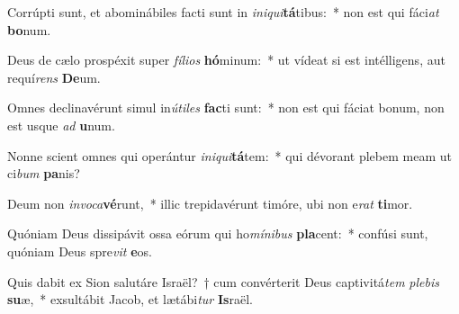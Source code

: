 \item Corrúpti sunt, et abominábiles facti sunt in \textit{in}\textit{i}\textit{qui}\textbf{tá}tibus:~* non est qui fáci\textit{at} \textbf{bo}num.
\item Deus de cælo prospéxit super \textit{fí}\textit{li}\textit{os} \textbf{hó}minum:~* ut vídeat si est intélligens, aut requí\textit{rens} \textbf{De}um.
\item Omnes declinavérunt simul in\textit{ú}\textit{ti}\textit{les} \textbf{fac}ti sunt:~* non est qui fáciat bonum, non est usque \textit{ad} \textbf{u}num.
\item Nonne scient omnes qui operántur \textit{in}\textit{i}\textit{qui}\textbf{tá}tem:~* qui dévorant plebem meam ut ci\textit{bum} \textbf{pa}nis?
\item Deum non \textit{in}\textit{vo}\textit{ca}\textbf{vé}runt,~* illic trepidavérunt timóre, ubi non e\textit{rat} \textbf{ti}mor.
\item Quóniam Deus dissipávit ossa eórum qui ho\textit{mí}\textit{ni}\textit{bus} \textbf{pla}cent:~* confúsi sunt, quóniam Deus spre\textit{vit} \textbf{e}os.
\item Quis dabit ex Sion salutáre Israël?~† cum convérterit Deus captivitá\textit{tem} \textit{ple}\textit{bis} \textbf{su}æ,~* exsultábit Jacob, et lætábi\textit{tur} \textbf{Is}raël.
